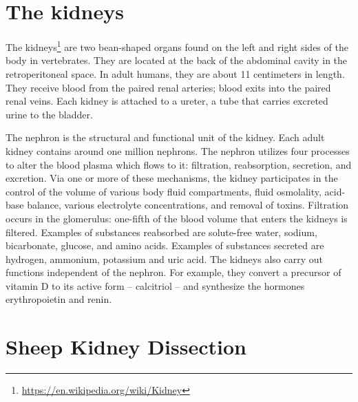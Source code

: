 \documentclass[]{book}
\let\rmarkdownfootnote\footnote%
\def\footnote{\protect\rmarkdownfootnote}
\renewcommand{\href}[2]{#2\footnote{\url{#1}}}
\begin{document}
\hypertarget{the-kidneys}{%
\section{The kidneys}\label{the-kidneys}}

The \href{https://en.wikipedia.org/wiki/Kidney}{kidneys} are two bean-shaped organs found on the left and right sides of the body in vertebrates. They are located at the back of the abdominal cavity in the retroperitoneal space. In adult humans, they are about 11 centimeters in length. They receive blood from the paired renal arteries; blood exits into the paired renal veins. Each kidney is attached to a ureter, a tube that carries excreted urine to the bladder.

The nephron is the structural and functional unit of the kidney. Each adult kidney contains around one million nephrons. The nephron utilizes four processes to alter the blood plasma which flows to it: filtration, reabsorption, secretion, and excretion. Via one or more of these mechanisms, the kidney participates in the control of the volume of various body fluid compartments, fluid osmolality, acid-base balance, various electrolyte concentrations, and removal of toxins. Filtration occurs in the glomerulus: one-fifth of the blood volume that enters the kidneys is filtered. Examples of substances reabsorbed are solute-free water, sodium, bicarbonate, glucose, and amino acids. Examples of substances secreted are hydrogen, ammonium, potassium and uric acid. The kidneys also carry out functions independent of the nephron. For example, they convert a precursor of vitamin D to its active form -- calcitriol -- and synthesize the hormones erythropoietin and renin.

\hypertarget{sheep-kidney-dissection}{%
\section{Sheep Kidney Dissection}\label{sheep-kidney-dissection}}
\end{document}
